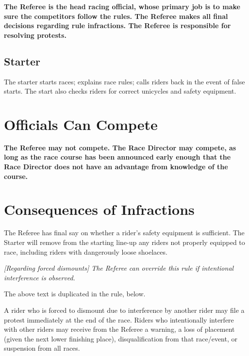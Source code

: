 \textbf{The Referee is the head racing official, whose primary job is to make sure
the competitors follow the rules.  The Referee makes all final decisions
regarding rule infractions. The Referee is responsible for resolving
protests.}

\subsection{Starter}

The starter starts races; explains race rules; calls riders back in the event of false starts. The start also checks riders for correct unicycles and safety equipment.

\section{Officials Can Compete}

\textbf{The Referee may not compete.  The Race Director may compete, as long as the race course has been announced early enough that the Race Director does not have an advantage from knowledge of the course.}

\section{Consequences of Infractions}

The Referee has final say on whether a rider's safety equipment is sufficient. 
The Starter will remove from the starting line-up any riders not properly equipped to race, including riders with dangerously loose shoelaces.

\textit{[Regarding forced dismounts] The Referee can override this rule if intentional interference is observed.}

\begin{framed}
The above text is duplicated in the rule, below.
\end{framed}

A rider who is forced to dismount due to interference by another rider may file a protest immediately at the end of the race.
Riders who intentionally interfere with other riders may receive from the Referee a warning, a loss of placement (given the next lower finishing place), disqualification from that race/event, or suspension from all races.
